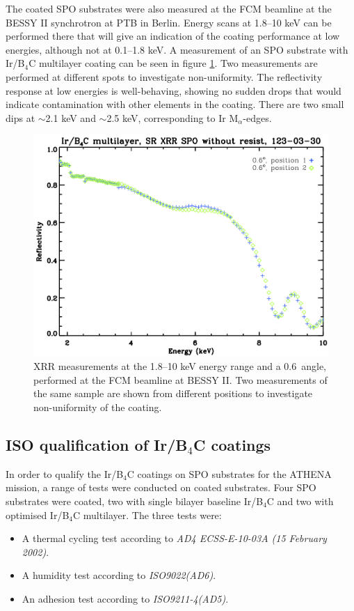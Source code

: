 The coated SPO substrates were also measured at the FCM beamline at the BESSY II synchrotron at PTB in Berlin. Energy scans at 1.8--10 keV can be performed there that will give an indication of the coating performance at low energies, although not at 0.1--1.8 keV. A measurement of an SPO substrate with Ir/B$_4$C multilayer coating can be seen in figure \ref{fig:spo_bessy}. Two measurements are performed at different spots to investigate non-uniformity. The reflectivity response at low energies is well-behaving, showing no sudden drops that would indicate contamination with other elements in the coating. There are two small dips at $\sim$2.1 keV and $\sim$2.5 keV, corresponding to Ir M$_{\alpha}$-edges.

\begin{figure}[!h]
  \center
\includegraphics[width=0.4\linewidth]{figures/athena/coating_on_spo/ml_irb4c_nores.jpg}
\caption{\footnotesize XRR measurements at the 1.8--10 keV energy range and a 0.6\degr\ angle, performed at the FCM beamline at BESSY II. Two measurements of the same sample are shown from different positions to investigate non-uniformity of the coating.}\label{fig:spo_bessy}
\end{figure}




\subsection{ISO qualification of Ir/B$_4$C coatings}\label{sec:qa_test}
In order to qualify the Ir/B$_4$C coatings on SPO substrates for the ATHENA mission, a range of tests were conducted on coated substrates. Four SPO substrates were coated, two with single bilayer baseline Ir/B$_4$C and two with optimised Ir/B$_4$C multilayer. The three tests were:

\begin{itemize}
 \item A thermal cycling test according to \emph{AD4 ECSS-E-10-03A (15 February 2002)}.
 \item A humidity test according to \emph{ISO9022(AD6)}.
 \item An adhesion test according to \emph{ISO9211-4(AD5)}.
\end{itemize}

